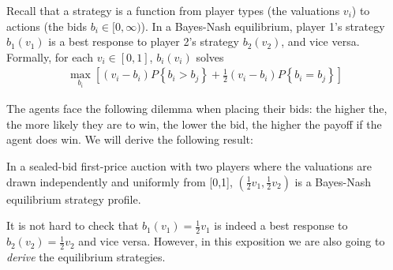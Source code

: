 Recall that a strategy is a function from player types (the valuations $v_i$) to actions (the bids $b_i \in [0, \infty)$). In a Bayes-Nash equilibrium, player 1's strategy $b_1(v_1)$ is a best response to player 2's strategy $b_2(v_2)$, and vice versa. Formally, for each $v_i \in [0,1]$, $b_i(v_i)$ solves
\begin{align}
 \max_{b_i} \left[ \left(v_i - b_i\right) P \left\{ b_i > b_j \right\} + \frac{1}{2} \left(v_i - b_i\right)P \left\{ b_i = b_j \right\} \right] \label{eq:auc:1}
\end{align}

The agents face the following dilemma when placing their bids: the higher the, the more likely they are to win, the lower the bid, the higher the payoff if the agent does win. We will derive the following result:
\begin{theorem}
In a sealed-bid first-price auction with two players where the valuations are drawn independently and uniformly from [0,1], $\left(\frac{1}{2}v_1,\frac{1}{2}v_2\right)$ is a Bayes-Nash equilibrium strategy profile.
\end{theorem}

It is not hard to check that $b_1(v_1)=\frac{1}{2}v_1$ is indeed a best response to $b_2(v_2)=\frac{1}{2}v_2$ and vice versa. However, in this exposition we are also going to \emph{derive} the equilibrium strategies.

